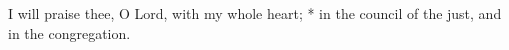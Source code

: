﻿I will praise thee, O Lord, with my whole heart; * in the council of the just, and in the congregation.